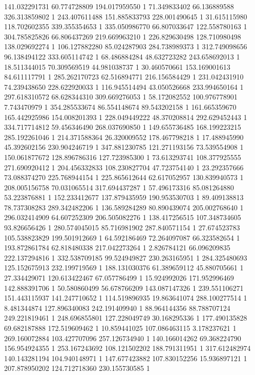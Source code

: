 141.032291731	60.774728809	194.017959550	1
71.349833402	66.136889588	326.313859802	1
243.407611488	151.885833793	228.001490645	1
31.615115980	118.702602355	339.355354653	1
335.050986770	66.807033647	122.558780163	1
304.785825826	66.806437269	219.669963210	1
226.829630498	128.710980498	138.029692274	1
106.127882280	85.024287903	284.738989373	1
312.749098656	96.138494122	333.605114742	1
68.486884284	48.632723282	243.658692013	1
18.511344015	70.309569519	44.981038737	1
30.460570661	153.169001613	84.611117791	1
285.262170723	62.516894771	216.156584429	1
231.042431910	74.239438650	228.622920033	1
116.945514494	43.050526668	233.994650164	1
297.618310572	68.628344310	309.669276053	1
58.172082552	100.976778901	7.743470979	1
354.285533674	86.554148674	89.543202158	1
161.665359670	165.442925986	154.008201393	1
228.049449222	48.370208814	292.629452443	1
334.717714812	59.456346490	268.037690850	1
149.655736485	168.199223215	285.192261046	1
214.371588364	26.320009552	178.467798218	1
17.488945990	45.392602156	230.904246719	1
347.881230785	121.271193156	73.539554908	1
150.061877672	128.896786316	127.723985300	1
73.613293741	108.377925555	271.690920412	1
204.456332833	108.230827704	47.723754140	1
23.292357666	73.088374270	225.768944154	1
225.865612644	62.617052957	130.839940573	1
208.005156758	70.031065514	317.694437287	1
57.496173316	85.081264880	53.223876881	1
152.233412677	137.879435959	190.953530703	1
89.409138813	78.737308283	289.342482206	1
136.589284289	80.890439074	205.002768640	1
296.032414909	64.607252309	206.505082276	1
138.417256515	107.348734605	93.826656426	1
280.574045015	85.716981902	287.840571154	1
27.674523783	105.538823829	199.501912669	1
64.592186469	72.264097087	66.323582654	1
193.872861784	62.818480338	217.042273264	1
2.826784121	66.096209835	222.137294816	1
332.538709185	99.524949827	230.263165951	1
284.325480693	125.152675913	232.199719569	1
188.131030376	61.389659112	45.880705661	1
27.334429071	120.613422467	67.057786499	1
15.924992026	171.952996469	142.888391706	1
50.580860499	56.678766209	143.087147326	1
239.551106271	151.443115937	141.247710652	1
114.519896935	19.863641074	288.100277514	1
8.481344874	127.896340083	242.191409940	1
88.964144356	88.788707124	249.221819461	1
248.696855801	127.228049749	30.168295336	1
177.490135828	69.682187888	172.519609462	1
10.859441025	107.086463115	3.178237621	1
269.160072884	103.427707096	257.126734940	1
140.166014262	69.368224790	156.954924355	1
253.167243692	108.121502202	188.791311951	1
317.612482974	140.143281194	104.940148971	1
147.677423882	107.830152256	15.936897121	1
207.878950202	124.712718360	230.155730585	1
